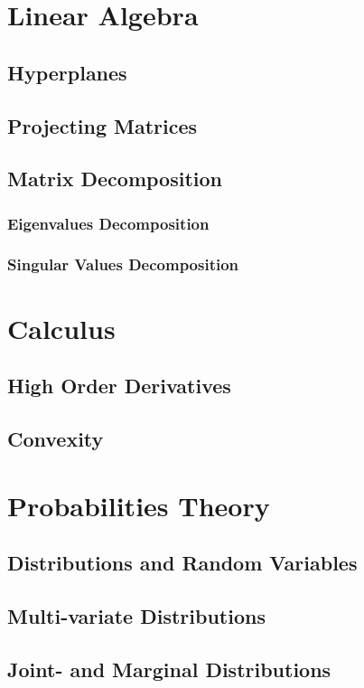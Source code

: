\documentclass[11pt,fleqn]{book} %
\begin{document}
    \section{Linear Algebra}
        \subsection{Hyperplanes}
        \subsection{Projecting Matrices}
        \subsection{Matrix Decomposition}
            \subsubsection{Eigenvalues Decomposition}
            \subsubsection{Singular Values Decomposition}
    \section{Calculus}
        \subsection{High Order Derivatives}
        \subsection{Convexity}
    \section{Probabilities Theory}
        \subsection{Distributions and Random Variables}
        \subsection{Multi-variate Distributions}
        \subsection{Joint- and Marginal Distributions}
\end{document}
